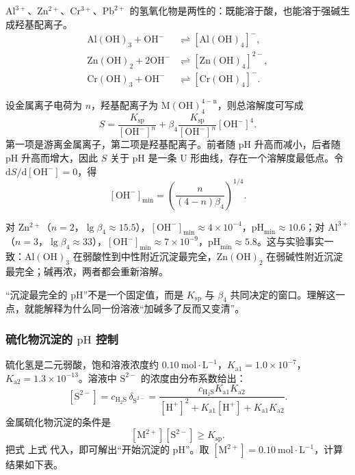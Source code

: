 \documentclass[UTF8]{ctexbook}
\begin{document}
$\mathrm{Al^{3+}}$、$\mathrm{Zn^{2+}}$、$\mathrm{Cr^{3+}}$、$\mathrm{Pb^{2+}}$ 的氢氧化物是两性的：既能溶于酸，也能溶于强碱生成羟基配离子。
\[\begin{aligned}
\mathrm{Al(OH)_3}+ \mathrm{OH^-} &\rightleftharpoons [\mathrm{Al(OH)_4}]^-, \\
\mathrm{Zn(OH)_2}+2\mathrm{OH^-} &\rightleftharpoons [\mathrm{Zn(OH)_4}]^{2-}, \\
\mathrm{Cr(OH)_3}+\mathrm{OH^-} &\rightleftharpoons [\mathrm{Cr(OH)_4}]^-.
\end{aligned}\]

设金属离子电荷为 $n$，羟基配离子为 $\mathrm{M(OH)_4^{4-n}}$，则总溶解度可写成
\[
S=\frac{K_{\mathrm{sp}}}{[\mathrm{OH^-}]^{n}}+\beta_4\frac{K_{\mathrm{sp}}}{[\mathrm{OH^-}]^{n}}[\mathrm{OH^-}]^4.
\]
第一项是游离金属离子，第二项是羟基配离子。前者随 $\mathrm{pH}$ 升高而减小，后者随 $\mathrm{pH}$ 升高而增大，因此 $S$ 关于 $\mathrm{pH}$ 是一条 U 形曲线，存在一个溶解度最低点。令 $\mathrm{d}S/\mathrm{d}[\mathrm{OH^-}]=0$，得
\[
[\mathrm{OH^-}]_{\min}=\left(\frac{n}{(4-n)\beta_4}\right)^{1/4}.
\]

对 $\mathrm{Zn^{2+}}$（$n=2$，$\lg\beta_4\approx15.5$），$[\mathrm{OH^-}]_{\min}\approx4\times10^{-4}$，$\mathrm{pH}_{\min}\approx10.6$；对 $\mathrm{Al^{3+}}$（$n=3$，$\lg\beta_4\approx33$），$[\mathrm{OH^-}]_{\min}\approx7\times10^{-9}$，$\mathrm{pH}_{\min}\approx5.8$。这与实验事实一致：$\mathrm{Al(OH)_3}$ 在弱酸性到中性附近沉淀最完全，$\mathrm{Zn(OH)_2}$ 在弱碱性附近沉淀最完全；碱再浓，两者都会重新溶解。

“沉淀最完全的 $\mathrm{pH}$”不是一个固定值，而是 $K_{\mathrm{sp}}$ 与 $\beta_4$ 共同决定的窗口。理解这一点，就能解释为什么同一份溶液“加碱多了反而又变清”。

\subsubsection{硫化物沉淀的 $\mathrm{pH}$ 控制}

硫化氢是二元弱酸，饱和溶液浓度约 $0.10\ \mathrm{mol\cdot L^{-1}}$，$K_{\mathrm{a1}}=1.0\times10^{-7}$，$K_{\mathrm{a2}}=1.3\times10^{-13}$。溶液中 $\mathrm{S^{2-}}$ 的浓度由分布系数给出：
\[
[\mathrm{S^{2-}}]=c_{\mathrm{H_2S}}\,\delta_{\mathrm{S^{2-}}}
=\frac{c_{\mathrm{H_2S}}K_{\mathrm{a1}}K_{\mathrm{a2}}}{[\mathrm{H^+}]^2+K_{\mathrm{a1}}[\mathrm{H^+}]+K_{\mathrm{a1}}K_{\mathrm{a2}}}.
\]
金属硫化物沉淀的条件是
\[
[\mathrm{M^{2+}}][\mathrm{S^{2-}}]\ge K_{\mathrm{sp}}.
\]
把式 上式 代入，即可解出“开始沉淀的 $\mathrm{pH}$”。取 $[\mathrm{M^{2+}}]=0.10\ \mathrm{mol\cdot L^{-1}}$，计算结果如下表。
\end{document}
